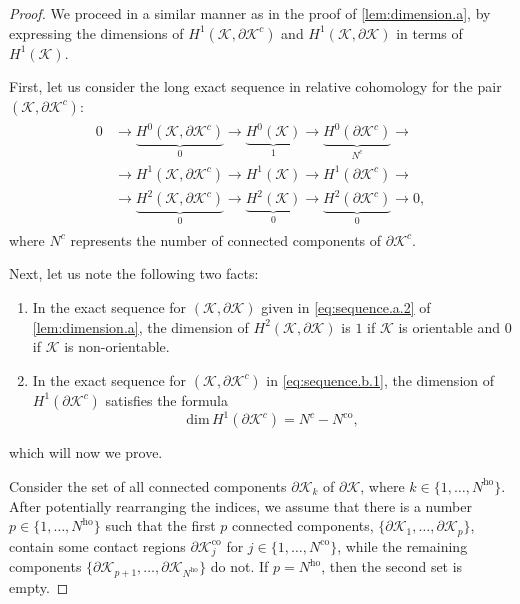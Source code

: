 \documentclass[a4paper,twoside,10pt]{article}
\theoremstyle{plain}
\theoremstyle{definition}
\theoremstyle{remark}
\newcommand{\mc}{\mathcal}
\newcommand{\K}{\mc{K}}
\newcommand{\rank}{\mathrm{dim}\,}
\newcommand{\ho}{\mathrm{ho}}
\newcommand{\co}{\mathrm{co}}
\begin{document}
\begin{proof}
We proceed in a similar manner as in the proof of \cref{lem:dimension.a}, by expressing the dimensions of $H^1(\K, \partial \K^{c})$ and $H^1(\K, \partial \K)$ in terms of $H^1(\K)$.

First, let us consider the long exact sequence in relative cohomology \cite[Theorem 12]{spivak1979comprehensive} for the pair $(\K, \partial \K^{c})$:
\begin{align}
\begin{split}
0 &\longrightarrow \underset{0}{\underbrace{H^0(\K, \partial \K^{c})}} \xrightarrow{} \underset{1}{\underbrace{H^0(\K)}} \xrightarrow{} \underset{N^{c}}{\underbrace{H^0(\partial \K^{c})}} \rightarrow\\
&\xrightarrow{} H^1( \K, \partial \K^{c}) \xrightarrow{} H^1(\K) \xrightarrow{} H^1(\partial \K^{c}) \rightarrow\\
&\xrightarrow{} \underset{0}{\underbrace{H^2(\K, \partial \K^{c})}} \xrightarrow{} \underset{0}{\underbrace{H^2(\K)}} \xrightarrow{} \underset{0}{\underbrace{H^2(\partial \K^{c})}} \longrightarrow 0,
\label{eq:sequence.b.1}
\end{split}
\end{align}
where $N^{c}$ represents the number of connected components of $\partial \K^{c}$.

Next, let us note the following two facts:
\begin{enumerate}
\item In the exact sequence for $(\K,\partial \K)$ given in \cref{eq:sequence.a.2} of \cref{lem:dimension.a}, the dimension of $H^2(\K, \partial \K)$ is $1$ if $\K$ is orientable and $0$ if $\K$ is non-orientable.
\item In the exact sequence for $(\K, \partial \K^{c})$ in \cref{eq:sequence.b.1}, the dimension of $H^1(\partial \K^{c})$ satisfies the formula
\begin{equation}
\rank{H^1(\partial \K^{c})} = N^{c} - N^{\co},
\label{eq:passage}
\end{equation}
\end{enumerate}
which will now we prove.

Consider the set of all connected components $\partial \K_k$ of $\partial \K$, where $k \in \{1, \dots, N^{\ho}\}$.
After potentially rearranging the indices, we assume that there is a number $p \in \{1, \dots, N^{\ho}\}$ such that the first $p$ connected components, $\{\partial \K_1, \dots, \partial \K_p \}$, contain some contact regions $\partial \K^{\co}_j$ for $j \in \{1, \dots, N^{\co}\}$, while the remaining components $\{\partial \K_{p+1}, \dots, \partial \K_{N^{\ho}}\}$ do not.
If $p=N^{\ho}$, then the second set is empty.


\end{proof}
\end{document}

